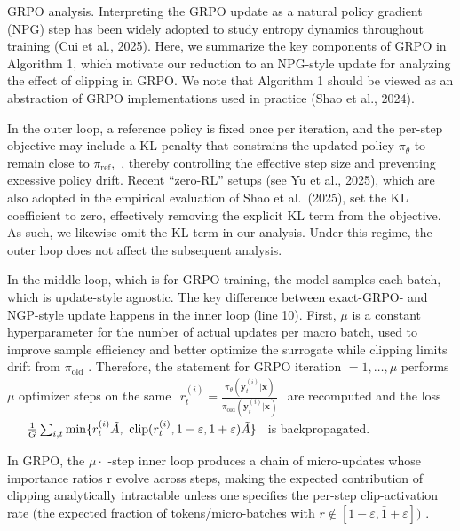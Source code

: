 \documentclass[
  10
]{article}
\begin{document}
GRPO analysis. Interpreting the GRPO update as a natural policy gradient
(NPG) step has been widely adopted to study entropy dynamics throughout
training (Cui et al., 2025). Here, we summarize the key components of
GRPO in Algorithm 1, which motivate our reduction to an NPG-style update
for analyzing the effect of clipping in GRPO. We note that Algorithm 1
should be viewed as an abstraction of GRPO implementations used in
practice (Shao et al., 2024).

In the outer loop, a reference policy is fixed once per iteration, and
the per-step objective may include a KL penalty that constrains the
updated policy \(\pi _ { \theta }\) to remain close to
\(\pi _ { \mathrm { r e f } } ,\) , thereby controlling the effective
step size and preventing excessive policy drift. Recent ``zero-RL''
setups (see Yu et al., 2025), which are also adopted in the empirical
evaluation of Shao et al.~(2025), set the KL coefficient to zero,
effectively removing the explicit KL term from the objective. As such,
we likewise omit the KL term in our analysis. Under this regime, the
outer loop does not affect the subsequent analysis.

In the middle loop, which is for GRPO training, the model samples each
batch, which is update-style agnostic. The key difference between
exact-GRPO- and NGP-style update happens in the inner loop (line 10).
First, \(\mu\) is a constant hyperparameter for the number of actual
updates per macro batch, used to improve sample efficiency and better
optimize the surrogate while clipping limits drift from
\(\pi _ { \mathrm { o l d } }\) . Therefore, the statement for GRPO
iteration \(= 1 , \ldots , \mu\) performs \(\mu\) optimizer steps on the
same
\(\begin{array} { r } { r _ { t } ^ { ( i ) } = \frac { \pi _ { \theta } ( \mathbf { y } _ { t } ^ { ( i ) } | \mathbf { x } ) } { \pi _ { \mathrm { o l d } } ( \mathbf { y } _ { t } ^ { ( i ) } | \mathbf { x } ) } } \end{array}\)
are recomputed and the loss
\(\begin{array} { r l } & { \frac { 1 } { G } \sum _ { i , t } \operatorname* { m i n } \{ r _ { t } ^ { ( i ) } \tilde { A } , \ \mathrm { c l i p } ( r _ { t } ^ { ( i ) } , 1 - \varepsilon , 1 + \varepsilon ) \tilde { A } \} } \end{array}\)
is backpropagated.

In GRPO, the \(\mu \cdot\) -step inner loop produces a chain of
micro-updates whose importance ratios r evolve across steps, making the
expected contribution of clipping analytically intractable unless one
specifies the per-step clip-activation rate (the expected fraction of
tokens/micro-batches with
\(r \not \in [ 1 - \varepsilon , \bar { 1 } + \varepsilon ] )\) .
\end{document}
